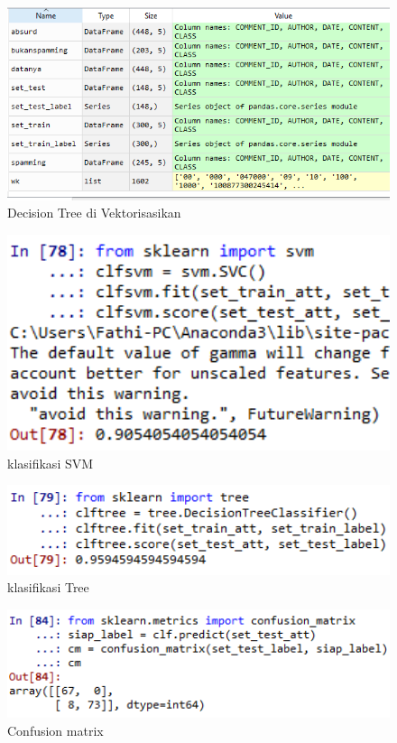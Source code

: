 \begin{figure}[!htbp]
	\centering
	\includegraphics[width=1\textwidth]{figures/fathi/chapter4/hari2/1}
	\caption{Decision Tree di Vektorisasikan}
	\label{fig1}
\end{figure}
\begin{figure}[!htbp]
	\centering
	\includegraphics[width=1\textwidth]{figures/fathi/chapter4/hari2/2}
	\caption{klasifikasi SVM}
	\label{fig2}
\end{figure}
\begin{figure}[!htbp]
	\centering
	\includegraphics[width=1\textwidth]{figures/fathi/chapter4/hari2/3}
	\caption{klasifikasi Tree}
	\label{fig3}
\end{figure}
\begin{figure}[!htbp]
	\centering
	\includegraphics[width=1\textwidth]{figures/fathi/chapter4/hari2/4}
	\caption{Confusion matrix}
	\label{fig4}
\end{figure}
